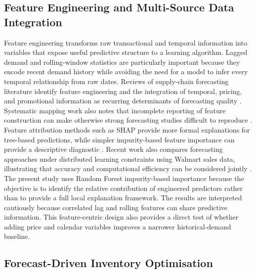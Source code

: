 \subsection{Feature Engineering and Multi-Source Data Integration}

Feature engineering transforms raw transactional and temporal information into variables that expose useful predictive structure to a learning algorithm.
Lagged demand and rolling-window statistics are particularly important because they encode recent demand history while avoiding the need for a model to infer every temporal relationship from raw dates.
Reviews of supply-chain forecasting literature identify feature engineering and the integration of temporal, pricing, and promotional information as recurring determinants of forecasting quality \cite{Nguyen2025SupplyChainML,Bergsma2025InventoryML}.
Systematic mapping work also notes that incomplete reporting of feature construction can make otherwise strong forecasting studies difficult to reproduce \cite{Bergsma2025InventoryML}.
Feature attribution methods such as SHAP provide more formal explanations for tree-based predictions, while simpler impurity-based feature importance can provide a descriptive diagnostic \cite{Pensa2025ExplainXGB}.
Recent work also compares forecasting approaches under distributed learning constraints using Walmart sales data, illustrating that accuracy and computational efficiency can be considered jointly \cite{Federated2025Demand}.
The present study uses Random Forest impurity-based importance because the objective is to identify the relative contribution of engineered predictors rather than to provide a full local explanation framework.
The results are interpreted cautiously because correlated lag and rolling features can share predictive information.
This feature-centric design also provides a direct test of whether adding price and calendar variables improves a narrower historical-demand baseline.

\subsection{Forecast-Driven Inventory Optimisation}

